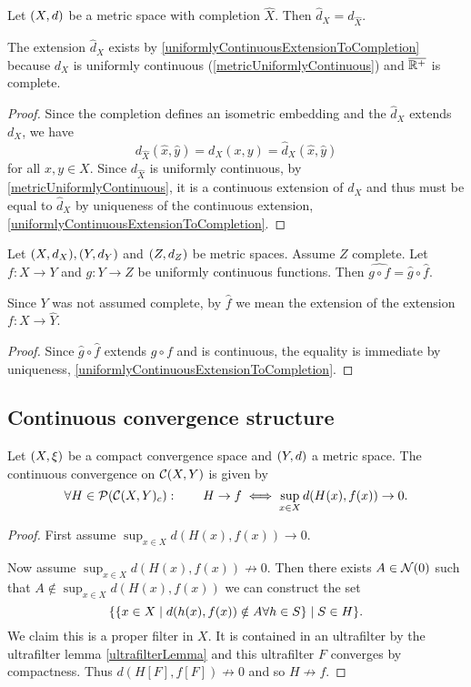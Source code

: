 \begin{lemma}
Let $\sSet{X,d}$ be a metric space with completion $\hat{X}$. Then $\hat{d}_X = d_{\hat{X}}$.
\end{lemma}
The extension $\hat{d}_X$ exists by \ref{uniformlyContinuousExtensionToCompletion} because $d_X$ is uniformly continuous (\ref{metricUniformlyContinuous}) and $\overline{\mathbb{R}^+}$ is complete.
\begin{proof}
Since the completion defines an isometric embedding and the $\hat{d}_X$ extends $d_X$, we have
\[ d_{\hat{X}}(\hat{x}, \hat{y}) = d_X(x,y) = \hat{d}_X(\hat{x}, \hat{y}) \]
for all $x,y\in X$. Since $d_{\hat{X}}$ is uniformly continuous, by \ref{metricUniformlyContinuous}, it is a continuous extension of $d_X$ and thus must be equal to $\hat{d}_X$ by uniqueness of the continuous extension, \ref{uniformlyContinuousExtensionToCompletion}.  
\end{proof}
\begin{lemma}
Let $\sSet{X,d_X}, \sSet{Y,d_Y}$ and $\sSet{Z,d_Z}$ be metric spaces. Assume $Z$ complete. Let $f: X\to Y$ and $g: Y\to Z$ be uniformly continuous functions. Then $\widehat{g\circ f} = \hat{g}\circ \hat{f}$.
\end{lemma}
Since $Y$ was not assumed complete, by $\hat{f}$ we mean the extension of the extension $f: X\to \hat{Y}$. 
\begin{proof}
Since $\hat{g}\circ \hat{f}$ extends $g\circ f$ and is continuous, the equality is immediate by uniqueness, \ref{uniformlyContinuousExtensionToCompletion}.
\end{proof}

\subsection{Continuous convergence structure}
\begin{proposition}
Let $\sSet{X,\xi}$ be a compact convergence space and $\sSet{Y,d}$ a metric space. The continuous convergence on $\operatorname{\mathcal{C}}(X,Y)$ is given by
\[ \forall H\in\operatorname{\mathcal{P}}(\operatorname{\mathcal{C}}(X,Y)_c): \qquad H\to f \iff \sup_{x\in X}d(H(x), f(x)) \to 0. \]
\end{proposition}
\begin{proof}
First assume $\sup_{x\in X}d(H(x), f(x)) \to 0$. 

Now assume $\sup_{x\in X}d(H(x), f(x)) \not\to 0$. Then there exists $A\in \operatorname{\mathcal{N}}(0)$ such that $A \notin \sup_{x\in X}d(H(x), f(x))$ we can construct the set
\[ \setbuilder{\setbuilder{x\in X}{d(h(x), f(x)) \notin A \forall h\in S}}{S\in H}. \]
We claim this is a proper filter in $X$. It is contained in an ultrafilter by the ultrafilter lemma \ref{ultrafilterLemma} and this ultrafilter $F$ converges by compactness. Thus $d(H[F], f[F]) \not\to 0$ and so $H\not\to f$.
\end{proof}


